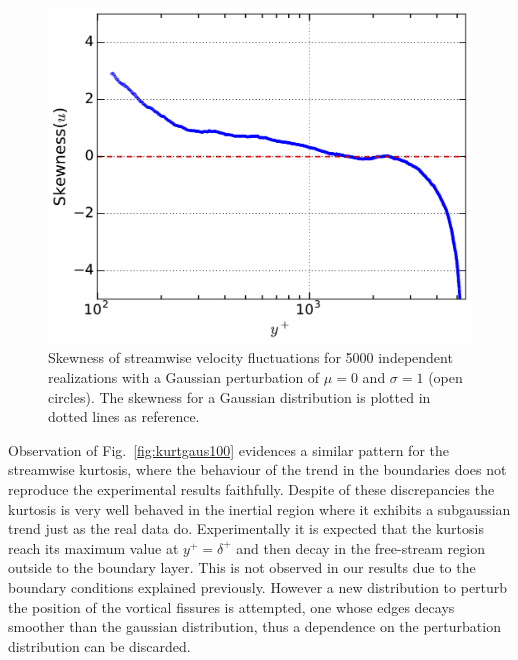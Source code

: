 \documentclass[aps,reprint,amsmath,amssymb,pra]{revtex4-1}%
\begin{document}
\begin{figure}[tb]
\includegraphics[scale=0.46]{figures/skewness_5000_assembles_gauss100}
\caption{\label{fig:skewgaus100} Skewness of streamwise velocity fluctuations for 5000 independent realizations with a Gaussian perturbation of $\mu=0$ and $\sigma=1$ (open circles). The skewness for a Gaussian distribution is plotted in dotted lines as reference.}
\end{figure}
Observation of Fig.~\ref{fig:kurtgaus100} evidences a similar pattern for the streamwise kurtosis, where the behaviour of the trend in the boundaries does not reproduce the experimental results faithfully. Despite of these discrepancies the kurtosis is very well behaved in the inertial region where it exhibits a subgaussian trend just as the real data do. Experimentally it is expected that the kurtosis reach its maximum value at $y^+=\delta^+$ and then decay in the free-stream region outside to the boundary layer. This is not observed in our results due to the boundary conditions explained previously. However a new distribution to perturb the position of the vortical fissures is attempted, one whose edges decays smoother than the gaussian distribution, thus a dependence on the perturbation distribution can be discarded.
\end{document}
